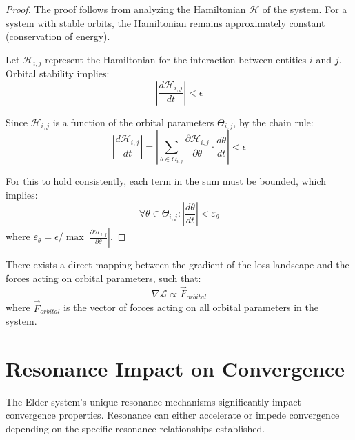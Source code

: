 \begin{proof}
The proof follows from analyzing the Hamiltonian $\mathcal{H}$ of the system. For a system with stable orbits, the Hamiltonian remains approximately constant (conservation of energy). 

Let $\mathcal{H}_{i,j}$ represent the Hamiltonian for the interaction between entities $i$ and $j$. Orbital stability implies:
\begin{equation}
\left|\frac{d\mathcal{H}_{i,j}}{dt}\right| < \epsilon
\end{equation}

Since $\mathcal{H}_{i,j}$ is a function of the orbital parameters $\Theta_{i,j}$, by the chain rule:
\begin{equation}
\left|\frac{d\mathcal{H}_{i,j}}{dt}\right| = \left|\sum_{\theta \in \Theta_{i,j}} \frac{\partial \mathcal{H}_{i,j}}{\partial \theta} \cdot \frac{d\theta}{dt}\right| < \epsilon
\end{equation}

For this to hold consistently, each term in the sum must be bounded, which implies:
\begin{equation}
\forall \theta \in \Theta_{i,j}: \left|\frac{d\theta}{dt}\right| < \varepsilon_{\theta}
\end{equation}
where $\varepsilon_{\theta} = \epsilon / \max\left|\frac{\partial \mathcal{H}_{i,j}}{\partial \theta}\right|$.
\end{proof}

\begin{corollary}
There exists a direct mapping between the gradient of the loss landscape and the forces acting on orbital parameters, such that:
\begin{equation}
\nabla \mathcal{L} \propto \vec{F}_{orbital}
\end{equation}
where $\vec{F}_{orbital}$ is the vector of forces acting on all orbital parameters in the system.
\end{corollary}

\section{Resonance Impact on Convergence}

The Elder system's unique resonance mechanisms significantly impact convergence properties. Resonance can either accelerate or impede convergence depending on the specific resonance relationships established.

